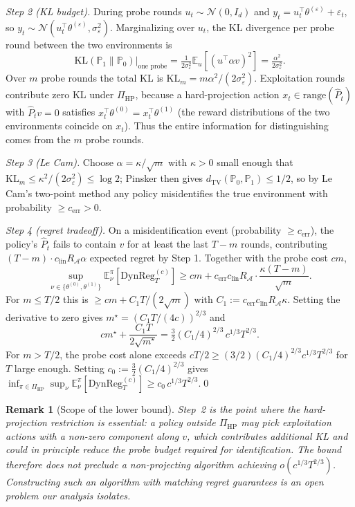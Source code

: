 \documentclass{article}
\newcommand{\E}{\mathbb{E}}
\newcommand{\cA}{\mathcal{A}}
\newcommand{\DynReg}{\mathrm{DynReg}}
\newcommand{\range}{\mathrm{range}}
\newtheorem{remark}{Remark}
\begin{document}
\emph{Step 2 (KL budget).}
During probe rounds $u_t\sim\mathcal N(0,I_d)$ and
$y_t = u_t^\top\theta^{(\varepsilon)} + \varepsilon_t$, so
$y_t\sim\mathcal N(u_t^\top\theta^{(\varepsilon)},\sigma_\varepsilon^2)$.
Marginalizing over $u_t$, the KL divergence per probe round between
the two environments is
\[
\mathrm{KL}(\mathbb P_1\|\mathbb P_0)\bigr|_{\text{one probe}}
= \tfrac{1}{2\sigma_\varepsilon^2}\E_u[(u^\top\alpha v)^2]
= \tfrac{\alpha^2}{2\sigma_\varepsilon^2}.
\]
Over $m$ probe rounds the total KL is
$\mathrm{KL}_m = m\alpha^2/(2\sigma_\varepsilon^2)$. Exploitation
rounds contribute zero KL under $\Pi_{\mathrm{HP}}$, because a
hard-projection action $x_t\in\range(\widehat P_t)$ with
$\widehat P_t v = 0$ satisfies
$x_t^\top\theta^{(0)} = x_t^\top\theta^{(1)}$ (the reward
distributions of the two environments coincide on $x_t$). Thus the
entire information for distinguishing comes from the $m$ probe
rounds.

\emph{Step 3 (Le Cam).}
Choose $\alpha = \kappa/\sqrt m$ with $\kappa>0$ small enough that
$\mathrm{KL}_m \le \kappa^2/(2\sigma_\varepsilon^2)\le\log 2$; Pinsker
then gives $d_{\mathrm{TV}}(\mathbb P_0,\mathbb P_1)\le 1/2$, so by
Le Cam's two-point method any policy misidentifies the true
environment with probability $\ge c_{\mathrm{err}}>0$.

\emph{Step 4 (regret tradeoff).}
On a misidentification event (probability $\ge c_{\mathrm{err}}$),
the policy's $\widehat P_t$ fails to contain $v$ for at least the
last $T-m$ rounds, contributing
$(T-m)\cdot c_{\mathrm{lin}} R_\cA\alpha$ expected regret by Step 1.
Together with the probe cost $cm$,
\[
\sup_{\nu\in\{\theta^{(0)},\theta^{(1)}\}} \E^\pi_\nu[\DynReg_T^{(c)}]
\ge cm + c_{\mathrm{err}} c_{\mathrm{lin}} R_\cA\cdot\frac{\kappa(T-m)}{\sqrt m}.
\]
For $m\le T/2$ this is $\ge cm + C_1 T/(2\sqrt m)$ with
$C_1 := c_{\mathrm{err}} c_{\mathrm{lin}} R_\cA\kappa$. Setting the
derivative to zero gives $m^\star = (C_1 T/(4c))^{2/3}$ and
\[
cm^\star + \frac{C_1 T}{2\sqrt{m^\star}}
= \tfrac{3}{2}(C_1/4)^{2/3}\,c^{1/3} T^{2/3}.
\]
For $m>T/2$, the probe cost alone exceeds
$cT/2 \ge (3/2)(C_1/4)^{2/3}c^{1/3}T^{2/3}$ for $T$ large enough.
Setting $c_0 := \tfrac{3}{2}(C_1/4)^{2/3}$ gives
$\inf_{\pi\in\Pi_{\mathrm{HP}}}\sup_\nu\E^\pi_\nu[\DynReg_T^{(c)}]
\ge c_0\,c^{1/3}T^{2/3}$.\qed

\begin{remark}[Scope of the lower bound]
\label{rem:lb_scope_conf}
Step~2 is the point where the hard-projection restriction is essential:
a policy outside $\Pi_{\mathrm{HP}}$ may pick exploitation actions with
a non-zero component along $v$, which contributes additional KL and
could in principle reduce the probe budget required for identification.
The bound therefore does \emph{not} preclude a non-projecting
algorithm achieving $o(c^{1/3}T^{2/3})$. Constructing such an
algorithm with matching regret guarantees is an open problem our
analysis isolates.
\end{remark}
\end{document}
